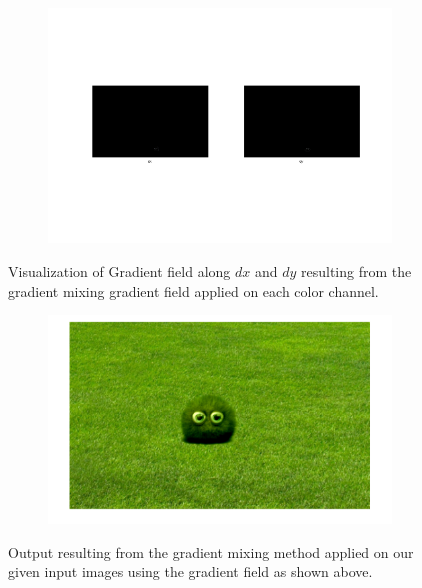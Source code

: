 \documentclass{paper}
\begin{document}
\begin{figure}[H]
    \centering
    \begin{subfigure}{1.0\textwidth}
        \includegraphics[width=\textwidth]{../../outputs/p4/seamless_cloning/monster/gradients}
    \end{subfigure}
    \caption{Visualization of Gradient field along $dx$ and $dy$ resulting from the gradient mixing gradient field applied on each color channel.}
    \label{fig:gradient_mixing_gradients}       
\end{figure}


\begin{figure}[H]
    \centering
    \begin{subfigure}{1.0\textwidth}
        \includegraphics[width=\textwidth]{../../outputs/p4/seamless_cloning/monster/output}
    \end{subfigure}
    \caption{Output resulting from the gradient mixing method applied on our given input images using the gradient field as shown above.}
    \label{fig:gradient_mixing_out}       
\end{figure}
\end{document}
